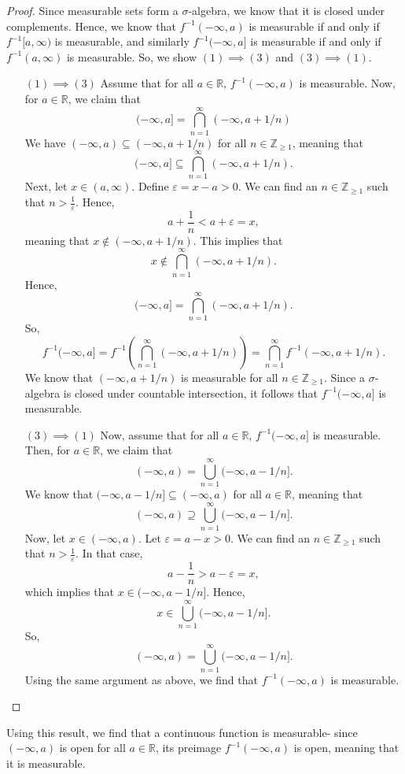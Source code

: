 \documentclass[a4paper, openany]{memoir}
\theoremstyle{definition}
\theoremstyle{plain}
\begin{document}
    \begin{proof}
        Since measurable sets form a $\sigma$-algebra, we know that it is closed under complements. Hence, we know that $f^{-1}(-\infty, a)$ is measurable if and only if $f^{-1}[a, \infty)$ is measurable, and similarly $f^{-1}(-\infty, a]$ is measurable if and only if $f^{-1}(a, \infty)$ is measurable. So, we show $(1) \implies (3)$ and $(3) \implies (1)$.
        \begin{enumerate}
            \item[$(1) \implies (3)$] Assume that for all $a \in \mathbb{R}$, $f^{-1}(-\infty, a)$ is measurable. Now, for $a \in \mathbb{R}$, we claim that
            \[(-\infty, a] = \bigcap_{n=1}^\infty (-\infty, a + 1/n)\]
            We have $(-\infty, a) \subseteq (-\infty, a + 1/n)$ for all $n \in \mathbb{Z}_{\geq 1}$, meaning that
            \[(-\infty, a] \subseteq \bigcap_{n=1}^\infty (-\infty, a + 1/n).\]
            Next, let $x \in (a, \infty)$. Define $\varepsilon = x - a > 0$. We can find an $n \in \mathbb{Z}_{\geq 1}$ such that $n > \frac{1}{\varepsilon}$. Hence, 
            \[a + \frac{1}{n} < a + \varepsilon = x,\]
            meaning that $x \not\in (-\infty, a + 1/n)$. This implies that
            \[x \not\in \bigcap_{n=1}^\infty (-\infty, a + 1/n).\]
            Hence,
            \[(-\infty, a] = \bigcap_{n=1}^\infty (-\infty, a + 1/n).\]
            So, 
            \[f^{-1}(-\infty, a] = f^{-1} \left(\bigcap_{n=1}^\infty (-\infty, a + 1/n)\right) = \bigcap_{n=1}^\infty f^{-1} (-\infty, a + 1/n).\]
            We know that $(-\infty, a+1/n)$ is measurable for all $n \in \mathbb{Z}_{\geq 1}$. Since a $\sigma$-algebra is closed under countable intersection, it follows that $f^{-1}(-\infty, a]$ is measurable.
            
            \item[$(3) \implies (1)$] Now, assume that for all $a \in \mathbb{R}$, $f^{-1} (-\infty, a]$ is measurable. Then, for $a \in \mathbb{R}$, we claim that
            \[(-\infty, a) = \bigcup_{n=1}^\infty (-\infty, a - 1/n].\]
            We know that $(-\infty, a-1/n] \subseteq (-\infty, a)$ for all $a \in \mathbb{R}$, meaning that
            \[(-\infty, a) \supseteq \bigcup_{n=1}^\infty (-\infty, a - 1/n].\]
            Now, let $x \in (-\infty, a)$. Let $\varepsilon = a - x > 0$. We can find an $n \in \mathbb{Z}_{\geq 1}$ such that $n > \frac{1}{\varepsilon}$. In that case,
            \[a - \frac{1}{n} > a - \varepsilon = x,\]
            which implies that $x \in (-\infty, a - 1/n]$. Hence,
            \[x \in \bigcup_{n=1}^\infty (-\infty, a - 1/n].\]
            So,
            \[(-\infty, a) = \bigcup_{n=1}^\infty (-\infty, a - 1/n].\]
            Using the same argument as above, we find that $f^{-1}(-\infty, a)$ is measurable.
        \end{enumerate}
    \end{proof}
    \noindent Using this result, we find that a continuous function is measurable- since $(-\infty, a)$ is open for all $a \in \mathbb{R}$, its preimage $f^{-1}(-\infty, a)$ is open, meaning that it is measurable.
\end{document}
